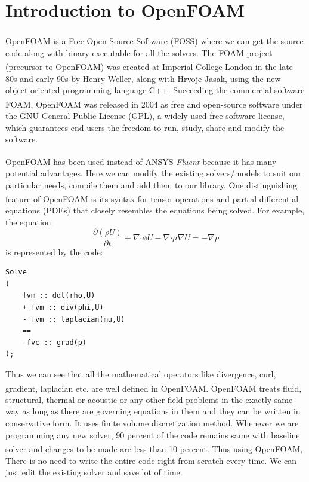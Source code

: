 \chapter{Introduction to \texorpdfstring{OpenFOAM\textsuperscript{\textregistered}}{Introduction to OpenFOAMs} }

\label{openfoam}

OpenFOAM\textsuperscript{\textregistered} is a Free Open Source Software (FOSS) where we can get the source code along with binary executable for all the solvers. The FOAM project (precursor to OpenFOAM\textsuperscript{\textregistered}) was created at Imperial College London in the late 80s and early 90s by Henry Weller, along with Hrvoje Jasak, using the new object-oriented programming language C++. Succeeding the commercial software FOAM, OpenFOAM\textsuperscript{\textregistered} was released in 2004 as free and open-source software under the GNU General Public License (GPL), a widely used free software license, which guarantees end users the freedom to run, study, share and modify the software.

OpenFOAM\textsuperscript{\textregistered} has been used instead of ANSYS\textsuperscript{\textregistered} \textit{Fluent} because it has many potential advantages. Here we can modify the existing solvers/models to suit our particular needs, compile them and add them to our library. One distinguishing feature of OpenFOAM\textsuperscript{\textregistered} is its syntax for tensor operations and partial differential equations (PDEs) that closely resembles the equations being solved. For example, the equation: 
\begin{equation}
\dfrac{\partial(\rho U)}{\partial t} + \nabla \boldsymbol{\cdot} \phi U - \nabla \boldsymbol{\cdot} \mu \nabla U = - \nabla p
\end{equation}
is represented by the code: 
\begin{verbatim}
Solve
(
	fvm :: ddt(rho,U)
	+ fvm :: div(phi,U)
	- fvm :: laplacian(mu,U)
	==
	-fvc :: grad(p)
);

\end{verbatim}

Thus we can see that all the mathematical operators like divergence, curl, gradient, laplacian etc. are well defined in OpenFOAM\textsuperscript{\textregistered}. OpenFOAM\textsuperscript{\textregistered} treats fluid, structural, thermal or acoustic or any other field problems in the exactly same way as long as there are governing equations in them and they can be written in conservative form. It uses finite volume discretization method. Whenever we are programming any new solver, 90 percent of the code remains same with baseline solver and changes to be made are less than 10 percent. Thus using OpenFOAM\textsuperscript{\textregistered}, There is no need to write the entire code right from scratch every time. We can just edit the existing solver and save lot of time.

